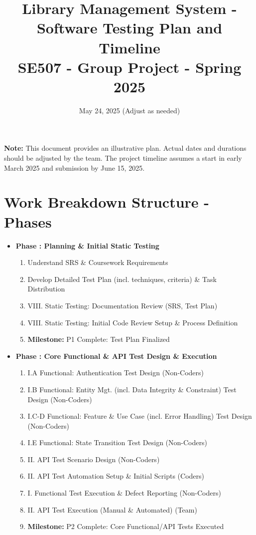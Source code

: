 \documentclass[12pt, a4paper]{article}
\title{Library Management System - Software Testing Plan and Timeline \\ \large SE507 - Group Project - Spring 2025}
\date{May 24, 2025 (Adjust as needed)}
\newcounter{phasecounter}
\renewcommand{\thephasecounter}{\arabic{phasecounter}}
\begin{document}
\maketitle
\begin{center}
    \textbf{Note:} This document provides an illustrative plan. Actual dates and durations should be adjusted by the team. The project timeline assumes a start in early March 2025 and submission by June 15, 2025.
\end{center}

\section*{Work Breakdown Structure - Phases}

\begin{itemize}[leftmargin=*] %
    \item {}\textbf{Phase \thephasecounter: Planning \& Initial Static Testing}
        \begin{enumerate}[label=\thephasecounter.\arabic*., labelindent=1em, leftmargin=*] %
            \item Understand SRS \& Coursework Requirements
            \item Develop Detailed Test Plan (incl. techniques, criteria) \& Task Distribution
            \item VIII. Static Testing: Documentation Review (SRS, Test Plan)
            \item VIII. Static Testing: Initial Code Review Setup \& Process Definition
            \item \textbf{Milestone:} P1 Complete: Test Plan Finalized
        \end{enumerate}

    \item {}\textbf{Phase \thephasecounter: Core Functional \& API Test Design \& Execution}
        \begin{enumerate}[label=\thephasecounter.\arabic*., labelindent=1em, leftmargin=*]
            \item I.A Functional: Authentication Test Design (Non-Coders)
            \item I.B Functional: Entity Mgt. (incl. Data Integrity \& Constraint) Test Design (Non-Coders)
            \item I.C-D Functional: Feature \& Use Case (incl. Error Handling) Test Design (Non-Coders)
            \item I.E Functional: State Transition Test Design (Non-Coders)
            \item II. API Test Scenario Design (Non-Coders)
            \item II. API Test Automation Setup \& Initial Scripts (Coders)
            \item I. Functional Test Execution \& Defect Reporting (Non-Coders)
            \item II. API Test Execution (Manual \& Automated) (Team)
            \item \textbf{Milestone:} P2 Complete: Core Functional/API Tests Executed
        \end{enumerate}


\end{itemize}
\end{document}

